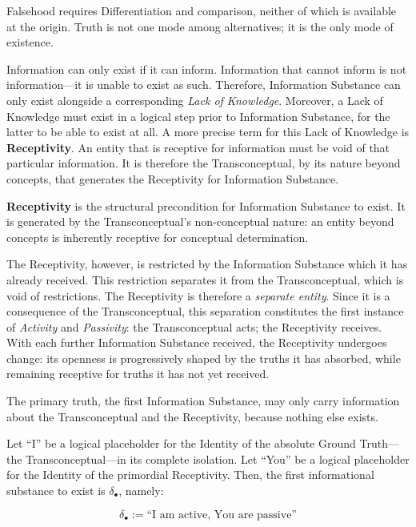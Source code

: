 Falsehood requires Differentiation and comparison, neither of which is
available at the origin. Truth is not one mode among alternatives; it is the
only mode of existence.

Information can only exist if it can inform. Information that cannot inform is
not information---it is unable to exist as such. Therefore, Information
Substance can only exist alongside a corresponding \textit{Lack of Knowledge}.
Moreover, a Lack of Knowledge must exist in a logical step prior to Information
Substance, for the latter to be able to exist at all. A more precise term for
this Lack of Knowledge is \textbf{Receptivity}. An entity that is receptive for
information must be void of that particular information. It is therefore the
Transconceptual, by its nature beyond concepts, that generates the Receptivity
for Information Substance.

\begin{formalism}[Receptivity]
    \textbf{Receptivity} is the structural precondition for Information
    Substance to exist. It is generated by the Transconceptual's non-conceptual
    nature: an entity beyond concepts is inherently receptive for conceptual
    determination.
\end{formalism}

The Receptivity, however, is restricted by the Information Substance which it
has already received. This restriction separates it from the Transconceptual,
which is void of restrictions. The Receptivity is therefore a \textit{separate
entity}. Since it is a consequence of the Transconceptual, this separation
constitutes the first instance of \textit{Activity} and \textit{Passivity}: the
Transconceptual acts; the Receptivity receives. With each further Information
Substance received, the Receptivity undergoes change: its openness is
progressively shaped by the truths it has absorbed, while remaining receptive
for truths it has not yet received.

The primary truth, the first Information Substance, may only carry information
about the Transconceptual and the Receptivity, because nothing else exists.

\begin{formalism}
    Let ``I'' be a logical placeholder for the Identity of the absolute Ground
    Truth---the Transconceptual---in its complete isolation. Let ``You'' be a
    logical placeholder for the Identity of the primordial Receptivity. Then,
    the first informational substance to exist is $\delta_\bullet$, namely:

    \begin{equation}
         \delta_\bullet := \text{``I am active, You are passive''}
    \end{equation}
\end{formalism}

